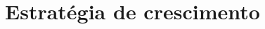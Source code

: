 \chapter{Estratégia de crescimento}
\label{chapter: Estratégia de crescimento}


\begin{commentA}

\par \end{commentA}
